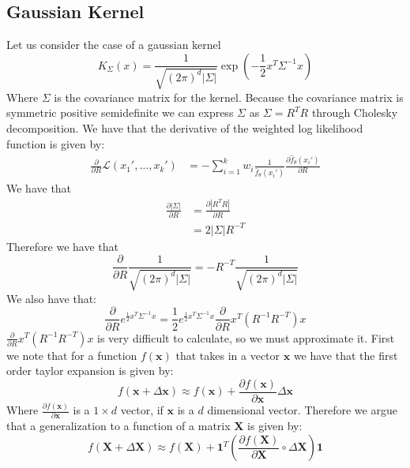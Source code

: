 \documentclass[10pt]{article}
\begin{document}
\subsection*{Gaussian Kernel}
Let us consider the case of a gaussian kernel 
$$K_{\Sigma}(x) = \frac{1}{\sqrt{(2\pi)^d|\Sigma|}}\exp\left(-\frac{1}{2}x^T\Sigma^{-1}x\right)$$
Where $\Sigma$ is the covariance matrix for the kernel. Because the 
covariance matrix is symmetric positive semidefinite 
we can express $\Sigma$ as $\Sigma = R^TR$ through Cholesky decomposition.
We have that the derivative of the 
weighted log likelihood function is given by:
\begin{align*}
    \frac{\partial}{\partial R}\mathcal{L}(x_1',\dots,x_k') &= -\sum_{i=1}^k w_i \frac{1}{\hat{f}_{\theta}(x_i')} \frac{\partial \hat{f}_{\theta}(x_i')}{\partial R}
\end{align*}
We have that 
\begin{align*}
    \frac{\partial |\Sigma|}{\partial R} &= \frac{\partial |R^TR|}{\partial R} \\
    &= 2|\Sigma|R^{-T}
\end{align*}
Therefore we have that 
\begin{equation}
    \frac{\partial}{\partial R}\frac{1}{\sqrt{(2\pi)^d|\Sigma|}} = -R^{-T}\frac{1}{\sqrt{(2\pi)^d|\Sigma|}}
\end{equation}
We also have that:
\begin{equation}
    \frac{\partial}{\partial R} e^{\frac{1}{2}x^T\Sigma^{-1}x} = \frac{1}{2}e^{\frac{1}{2}x^T\Sigma^{-1}x} \frac{\partial}{\partial R} x^T(R^{-1}R^{-T})x
\end{equation}
$\frac{\partial}{\partial R} x^T(R^{-1}R^{-T})x$ is very difficult to calculate, so we must approximate it. First we note that for 
a function $f(\mathbf{x})$ that takes in a vector $\mathbf{x}$ we have that the first order taylor expansion is given by:
\begin{equation}
    f(\mathbf{x}+\Delta \mathbf{x}) \approx f(\mathbf{x}) + \frac{\partial f(\mathbf{x})}{\partial \mathbf{x}}\Delta \mathbf{x}
\end{equation}
Where $\frac{\partial f(\mathbf{x})}{\partial \mathbf{x}}$ is a $1\times d$ vector, if $\mathbf{x}$ is a $d$ dimensional vector. Therefore 
we argue that a generalization to a function of a matrix $\mathbf{X}$ is given by:
\begin{equation}
    f(\mathbf{X}+\Delta \mathbf{X}) \approx f(\mathbf{X}) + \mathbf{1}^T\left(\frac{\partial f(\mathbf{X})}{\partial \mathbf{X}}\circ \Delta \mathbf{X}\right)\mathbf{1}
\end{equation}
\end{document}
